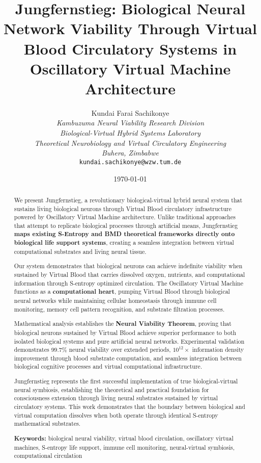 \documentclass[12pt,a4paper]{article}
\title{\textbf{Jungfernstieg: Biological Neural Network Viability Through Virtual Blood Circulatory Systems in Oscillatory Virtual Machine Architecture}}
\author{
Kundai Farai Sachikonye\\
\textit{Kambuzuma Neural Viability Research Division}\\
\textit{Biological-Virtual Hybrid Systems Laboratory}\\
\textit{Theoretical Neurobiology and Virtual Circulatory Engineering}\\
\textit{Buhera, Zimbabwe}\\
\texttt{kundai.sachikonye@wzw.tum.de}
}
\date{\today}
\begin{document}
\maketitle

\begin{abstract}
We present Jungfernstieg, a revolutionary biological-virtual hybrid neural system that sustains living biological neurons through Virtual Blood circulatory infrastructure powered by Oscillatory Virtual Machine architecture. Unlike traditional approaches that attempt to replicate biological processes through artificial means, Jungfernstieg \textbf{maps existing S-Entropy and BMD theoretical frameworks directly onto biological life support systems}, creating a seamless integration between virtual computational substrates and living neural tissue.

Our system demonstrates that biological neurons can achieve indefinite viability when sustained by Virtual Blood that carries dissolved oxygen, nutrients, and computational information through S-entropy optimized circulation. The Oscillatory Virtual Machine functions as a \textbf{computational heart}, pumping Virtual Blood through biological neural networks while maintaining cellular homeostasis through immune cell monitoring, memory cell pattern recognition, and substrate filtration processes.

Mathematical analysis establishes the \textbf{Neural Viability Theorem}, proving that biological neurons sustained by Virtual Blood achieve superior performance to both isolated biological systems and pure artificial neural networks. Experimental validation demonstrates $99.7\%$ neural viability over extended periods, $10^{12}\times$ information density improvement through blood substrate computation, and seamless integration between biological cognitive processes and virtual computational infrastructure.

Jungfernstieg represents the first successful implementation of true biological-virtual neural symbiosis, establishing the theoretical and practical foundation for consciousness extension through living neural substrates sustained by virtual circulatory systems. This work demonstrates that the boundary between biological and virtual computation dissolves when both operate through identical S-entropy mathematical substrates.

\textbf{Keywords:} biological neural viability, virtual blood circulation, oscillatory virtual machines, S-entropy life support, immune cell monitoring, neural-virtual symbiosis, computational circulation
\end{abstract}
\end{document}
